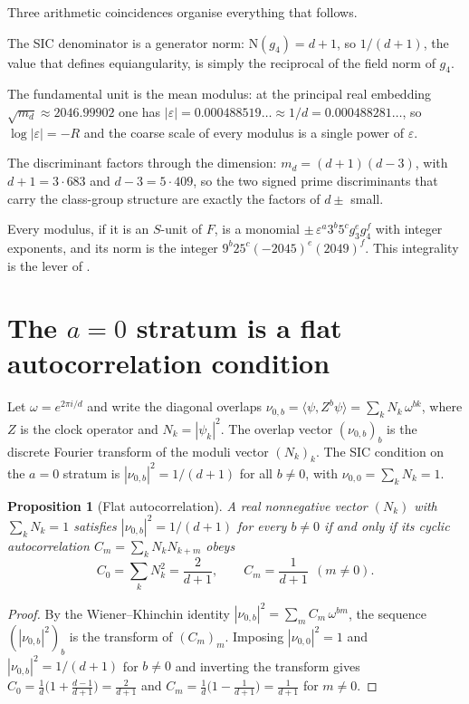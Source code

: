 \documentclass[12pt,a4paper]{article}
\newtheorem{proposition}[theorem]{Proposition}
\newcommand{\Fd}{F}
\newcommand{\md}{m_d}
\newcommand{\Norm}{\mathrm{N}}
\begin{document}
Three arithmetic coincidences organise everything that follows.

The SIC denominator is a generator norm: $\Norm(g_4)=d+1$, so $1/(d+1)$, the
value that defines equiangularity, is simply the reciprocal of the field norm
of $g_4$.

The fundamental unit is the mean modulus: at the principal real embedding
$\sqrt{\md}\approx 2046.99902$ one has
$|\varepsilon| = 0.000488519\ldots \approx 1/d = 0.000488281\ldots$, so
$\log|\varepsilon| = -R$ and the coarse scale of every modulus is a single power
of $\varepsilon$.

The discriminant factors through the dimension: $\md = (d+1)(d-3)$, with
$d+1=3\cdot 683$ and $d-3 = 5\cdot 409$, so the two signed prime discriminants
that carry the class-group structure are exactly the factors of $d\pm$ small.

Every modulus, if it is an $S$-unit of $\Fd$, is a monomial
$\pm\,\varepsilon^{a}3^{b}5^{c}g_3^{e}g_4^{f}$ with integer exponents, and its
norm is the integer $9^{b}25^{c}(-2045)^{e}(2049)^{f}$.  This integrality is the
lever of .

\section{The $a=0$ stratum is a flat autocorrelation condition}
\label{sec:autocorr}

Let $\omega = e^{2\pi i/d}$ and write the diagonal overlaps
$\nu_{0,b} = \langle \psi, Z^b \psi\rangle = \sum_k N_k\,\omega^{bk}$, where
$Z$ is the clock operator and $N_k=|\psi_k|^2$.  The overlap vector
$(\nu_{0,b})_b$ is the discrete Fourier transform of the moduli vector
$(N_k)_k$.  The SIC condition on the $a=0$ stratum is
$|\nu_{0,b}|^2 = 1/(d+1)$ for all $b\neq 0$, with $\nu_{0,0}=\sum_k N_k = 1$.

\begin{proposition}[Flat autocorrelation]
\label{prop:autocorr}
A real nonnegative vector $(N_k)$ with $\sum_k N_k = 1$ satisfies
$|\nu_{0,b}|^2 = 1/(d+1)$ for every $b\neq 0$ if and only if its cyclic
autocorrelation $C_m = \sum_k N_k N_{k+m}$ obeys
\[
C_0 = \sum_k N_k^2 = \frac{2}{d+1},
\qquad
C_m = \frac{1}{d+1}\ \ (m\neq 0).
\]
\end{proposition}

\begin{proof}
By the Wiener--Khinchin identity $|\nu_{0,b}|^2 = \sum_m C_m\,\omega^{bm}$, the
sequence $(|\nu_{0,b}|^2)_b$ is the transform of $(C_m)_m$.  Imposing
$|\nu_{0,0}|^2 = 1$ and $|\nu_{0,b}|^2 = 1/(d+1)$ for $b\neq 0$ and inverting the
transform gives $C_0 = \tfrac1d\big(1 + \tfrac{d-1}{d+1}\big) = \tfrac{2}{d+1}$
and $C_m = \tfrac1d\big(1 - \tfrac{1}{d+1}\big) = \tfrac1{d+1}$ for $m\neq 0$.
\end{proof}
\end{document}
